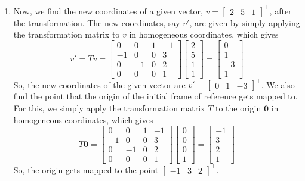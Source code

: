 \documentclass[10pt]{article}
\begin{document}
\begin{enumerate}
        \item Now, we find the new coordinates of a given vector,
        $v = \begin{bmatrix} 2 & 5 & 1 \end{bmatrix}^{\top}$, after the transformation.
        The new coordinates, say $v'$, are given by simply applying the transformation
        matrix to $v$ in homogeneous coordinates, which gives
        \begin{equation*}
            v' = T v = \begin{bmatrix}
                0 & 0 & 1 & -1 \\
                -1 & 0 & 0 & 3 \\
                0 & -1 & 0 & 2 \\
                0 & 0 & 0 & 1
            \end{bmatrix} \begin{bmatrix} 2 \\ 5 \\ 1 \\ 1 \end{bmatrix} = \begin{bmatrix}
                0 \\
                1 \\
                -3 \\
                1
            \end{bmatrix}
        \end{equation*}
        So, the new coordinates of the given vector are
        $v' = \begin{bmatrix} 0 & 1 & -3 \end{bmatrix}^{\top}$. We also find the point
        that the origin of the initial frame of reference gets mapped to. For this, we
        simply apply the transformation matrix $T$ to the origin $\mathbf{0}$ in homogeneous
        coordinates, which gives
        \begin{equation*}
            T \mathbf{0} = \begin{bmatrix}
                0 & 0 & 1 & -1 \\
                -1 & 0 & 0 & 3 \\
                0 & -1 & 0 & 2 \\
                0 & 0 & 0 & 1
            \end{bmatrix} \begin{bmatrix} 0 \\ 0 \\ 0 \\ 1 \end{bmatrix} = \begin{bmatrix}
                -1 \\
                3 \\
                2 \\
                1
            \end{bmatrix}
        \end{equation*}
        So, the origin gets mapped to the point $\begin{bmatrix} -1 & 3 & 2 \end{bmatrix}^{\top}$.


\end{enumerate}
\end{document}
